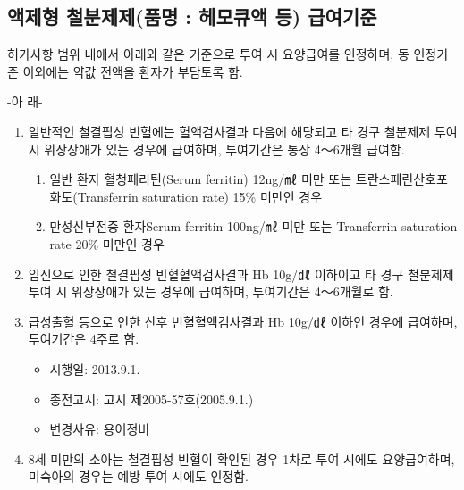 \subsection{액제형 철분제제(품명 : 헤모큐액 등) 급여기준}
허가사항 범위 내에서 아래와 같은 기준으로 투여 시 요양급여를 인정하며, 동 인정기준 이외에는 약값 전액을 환자가 부담토록 함.\par
-아 래-
\begin{enumerate}[가.]\tightlist
\item 일반적인 철결핍성 빈혈에는 혈액검사결과 다음에 해당되고 타 경구 철분제제 투여 시 위장장애가 있는 경우에 급여하며, 투여기간은 통상 4～6개월 급여함.
	\begin{enumerate}[1)]\tightlist
	\item 일반 환자 혈청페리틴(Serum ferritin) 12ng/㎖ 미만 또는 트란스페린산호포화도(Transferrin saturation rate) 15\% 미만인 경우 
	\item 만성신부전증 환자Serum ferritin 100ng/㎖ 미만 또는 Transferrin saturation rate 20\% 미만인 경우 
	\end{enumerate}
\item 임신으로 인한 철결핍성 빈혈혈액검사결과 Hb 10g/㎗ 이하이고 타 경구 철분제제 투여 시 위장장애가 있는 경우에 급여하며, 투여기간은 4～6개월로 함. 
\item 급성출혈 등으로 인한 산후 빈혈혈액검사결과 Hb 10g/㎗ 이하인 경우에 급여하며, 투여기간은 4주로 함.    
	\begin{itemize}[*]\tightlist
	\item 시행일: 2013.9.1.
	\item 종전고시: 고시 제2005-57호(2005.9.1.)
	\item 변경사유: 용어정비
	\end{itemize}
\item 8세 미만의 소아는 철결핍성 빈혈이 확인된 경우 1차로 투여 시에도 요양급여하며, 미숙아의 경우는 예방 투여 시에도 인정함.
\end{enumerate}
\prezi{\clearpage}
